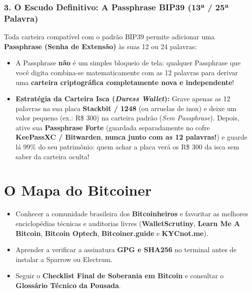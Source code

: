 \documentclass{pousadaguide}
\begin{document}
\subsection{3. O Escudo Definitivo: A Passphrase BIP39 (13ª / 25ª Palavra)}
Toda carteira compatível com o padrão BIP39 permite adicionar uma \textbf{Passphrase (Senha de Extensão)} às suas 12 ou 24 palavras:
\begin{itemize}
  \item A Passphrase \textbf{não} é um simples bloqueio de tela: qualquer Passphrase que você digita combina-se matematicamente com as 12 palavras para derivar uma \textbf{carteira criptográfica completamente nova e independente}!
  \item \textbf{Estratégia da Carteira Isca (\emph{Duress Wallet}):} Grave apenas as 12 palavras na sua placa \textbf{Stackbit / 1248} (ou arruelas de inox) e deixe um valor pequeno (ex.: R\$ 300) na carteira padrão (\emph{Sem Passphrase}). Depois, ative sua \textbf{Passphrase Forte} (guardada separadamente no cofre \textbf{KeePassXC / Bitwarden}, \textbf{nunca junto com as 12 palavras!}) e guarde lá 99\% do seu patrimônio: quem achar a placa verá os R\$ 300 da isca sem saber da carteira oculta!
\end{itemize}

\chapter{O Mapa do Bitcoiner}

\begin{missao}
\begin{itemize}
  \item Conhecer a comunidade brasileira dos \textbf{Bitcoinheiros} e favoritar as melhores enciclopédias técnicas e auditorias livres (\textbf{WalletScrutiny}, \textbf{Learn Me A Bitcoin}, \textbf{Bitcoin Optech}, \textbf{Bitcoiner.guide} e \textbf{KYCnot.me}).
  \item Aprender a verificar a assinatura \textbf{GPG e SHA256} no terminal antes de instalar a Sparrow ou Electrum.
  \item Seguir o \textbf{Checklist Final de Soberania em Bitcoin} e consultar o \textbf{Glossário Técnico da Pousada}.
\end{itemize}
\end{missao}
\end{document}
